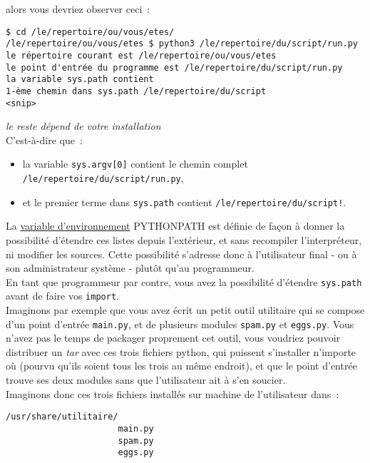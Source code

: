 alors vous devriez observer ceci~:

    \begin{verbatim}
$ cd /le/repertoire/ou/vous/etes/
/le/repertoire/ou/vous/etes $ python3 /le/repertoire/du/script/run.py
le répertoire courant est /le/repertoire/ou/vous/etes
le point d'entrée du programme est /le/repertoire/du/script/run.py
la variable sys.path contient
1-ème chemin dans sys.path /le/repertoire/du/script
<snip>
\end{verbatim}

\emph{le reste dépend de votre installation}\\

    C'est-à-dire que~:

\begin{itemize}
\tightlist
\item
  la variable \texttt{sys.argv{[}0{]}} contient le chemin complet
  \texttt{/le/repertoire/du/script/run.py},
\item
  et le premier terme dans \texttt{sys.path} contient
  \texttt{/le/repertoire/du/script!}.
\end{itemize}

    La \href{http://en.wikipedia.org/wiki/Environment_variable}{variable
d'environnement} PYTHONPATH est définie de façon à donner la possibilité
d'étendre ces listes depuis l'extérieur, et sans recompiler
l'interpréteur, ni modifier les sources. Cette possibilité s'adresse
donc à l'utilisateur final - ou à son administrateur système - plutôt
qu'au programmeur.\\

    En tant que programmeur par contre, vous avez la possibilité d'étendre
\texttt{sys.path} avant de faire vos \texttt{import}.\\

Imaginons par exemple que vous avez écrit un petit outil utilitaire qui
se compose d'un point d'entrée \texttt{main.py}, et de plusieurs modules
\texttt{spam.py} et \texttt{eggs.py}. Vous n'avez pas le temps de
packager proprement cet outil, vous voudriez pouvoir distribuer un
\emph{tar} avec ces trois fichiers python, qui puissent s'installer
n'importe où (pourvu qu'ils soient tous les trois au même endroit), et
que le point d'entrée trouve ses deux modules sans que l'utilisateur ait
à s'en soucier.\\

Imaginons donc ces trois fichiers installés sur machine de l'utilisateur
dans~:

    \begin{verbatim}
/usr/share/utilitaire/
                      main.py
                      spam.py
                      eggs.py
\end{verbatim}

